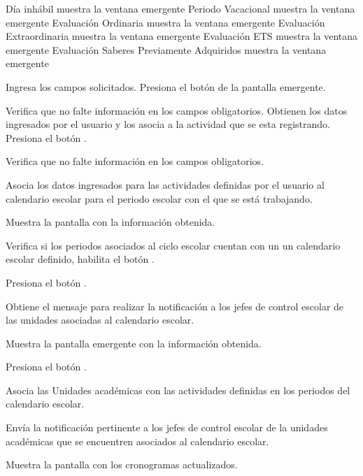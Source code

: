 \begin{UCtrayectoria}
        \begin{Titemize}
        	\Titem Día inhábil muestra la ventana emergente 
        	\Titem Periodo Vacacional muestra la ventana emergente 
        	\Titem Evaluación Ordinaria muestra la ventana emergente 
        	\Titem Evaluación Extraordinaria muestra la ventana emergente 
       		\Titem Evaluación ETS muestra la ventana emergente 
       		\Titem Evaluación Saberes Previamente Adquiridos muestra la ventana emergente 
        	
        \end{Titemize}   
    
     \UCpaso [\UCactor] \label{IN-DAE-CU2.1:pop} Ingresa los campos solicitados.
     \UCpaso [\UCactor] Presiona el botón  de la pantalla emergente.
     
     \UCpaso Verifica que no falte información en los campos obligatorios. 
     \UCpaso Obtienen los datos ingresados por el usuario y los asocia a la actividad que se esta registrando.
     \UCpaso [\UCactor] \label{IN-DAE-CU2.1:noti} Presiona el botón .     
     
     \UCpaso Verifica que no falte información en los campos obligatorios. 
    
    \UCpaso Asocia los datos ingresados para las actividades definidas por el usuario al calendario escolar para el periodo escolar con el que se está trabajando. 
 
    \UCpaso Muestra la pantalla  con la información obtenida. 
    
	\UCpaso \label{IN-DAE-CU2.1:cannoti} Verifica si los periodos asociados al ciclo escolar cuentan con un un calendario escolar definido, habilita el botón . 

 	\UCpaso [\UCactor] Presiona el botón . 

	\UCpaso Obtiene el mensaje   para realizar la notificación a los jefes de control escolar de las unidades asociadas al calendario escolar. 
	
	
	\UCpaso \label{IN-DAE-CU2.1:emergente} Muestra la pantalla emergente   con la información obtenida. 
	
	\UCpaso [\UCactor] Presiona el botón .
	
	\UCpaso Asocia las Unidades académicas con las actividades definidas en los periodos del calendario escolar. 
		
	\UCpaso Envía la notificación pertinente a los jefes de control escolar de la unidades académicas que se encuentren asociados al calendario escolar. 
	
	 \UCpaso Muestra la pantalla  con los cronogramas actualizados.
	

\end{UCtrayectoria}



